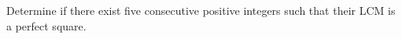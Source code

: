 Determine if there exist five consecutive positive integers such that their LCM is a perfect square.
